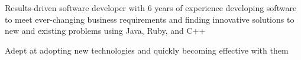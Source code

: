%
    \begin{itemize*}
        \item Results-driven software developer with 6 years of experience developing software to meet ever-changing business requirements
            and finding innovative solutions to new and existing problems using Java, Ruby, and C++
        \item Adept at adopting new technologies and quickly becoming effective with them
    \end{itemize*}
